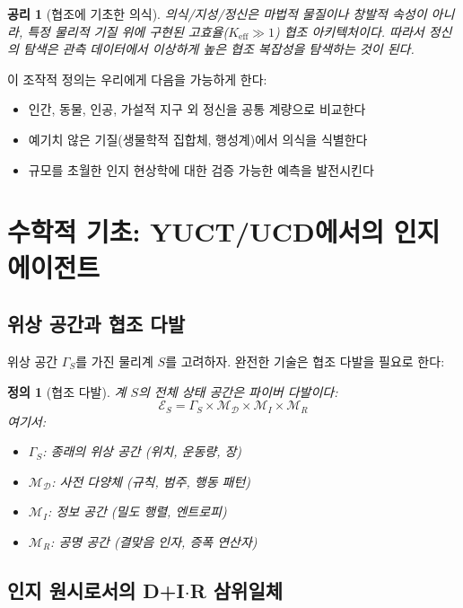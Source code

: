 \documentclass[11pt,a4paper]{article}
\newtheorem{definition}{정의}
\newtheorem{axiom}{공리}
\newcommand{\eff}{\mathrm{eff}}
\newcommand{\Dict}{\mathcal{D}}
\newcommand{\Mdict}{\mathcal{M}_{\Dict}}
\newcommand{\Ke}{K_{\eff}}
\begin{document}
	\begin{axiom}[협조에 기초한 의식]
		의식/지성/정신은 마법적 물질이나 창발적 속성이 아니라, 특정 물리적 기질 위에 구현된 고효율(\(\Ke \gg 1\)) 협조 아키텍처이다. 따라서 정신의 탐색은 관측 데이터에서 이상하게 높은 협조 복잡성을 탐색하는 것이 된다.
	\end{axiom}
	
	이 조작적 정의는 우리에게 다음을 가능하게 한다:
	\begin{itemize}
		\item 인간, 동물, 인공, 가설적 지구 외 정신을 공통 계량으로 비교한다
		\item 예기치 않은 기질(생물학적 집합체, 행성계)에서 의식을 식별한다
		\item 규모를 초월한 인지 현상학에 대한 검증 가능한 예측을 발전시킨다
	\end{itemize}
	
	\section{수학적 기초: YUCT/UCD에서의 인지 에이전트}
	
	\subsection{위상 공간과 협조 다발}
	
	위상 공간 \(\Gamma_S\)를 가진 물리계 \(S\)를 고려하자. 완전한 기술은 협조 다발을 필요로 한다:
	
	\begin{definition}[협조 다발]
		계 \(S\)의 전체 상태 공간은 파이버 다발이다:
		\[
		\mathcal{E}_S = \Gamma_S \times \Mdict \times \mathcal{M}_I \times \mathcal{M}_R
		\]
		여기서:
		\begin{itemize}
			\item \(\Gamma_S\): 종래의 위상 공간 (위치, 운동량, 장)
			\item \(\Mdict\): 사전 다양체 (규칙, 범주, 행동 패턴)
			\item \(\mathcal{M}_I\): 정보 공간 (밀도 행렬, 엔트로피)
			\item \(\mathcal{M}_R\): 공명 공간 (결맞음 인자, 증폭 연산자)
		\end{itemize}
	\end{definition}
	
	\subsection{인지 원시로서의 D+I\(\cdot\)R 삼위일체}
	
\end{document}
